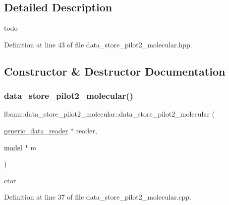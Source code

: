 \subsection{Detailed Description}
todo 

Definition at line 43 of file data\+\_\+store\+\_\+pilot2\+\_\+molecular.\+hpp.



\subsection{Constructor \& Destructor Documentation}
\mbox{\label{classlbann_1_1data__store__pilot2__molecular_a125dd5e8628bb97608bd8e4a7b7428ef}} 
\subsubsection{\texorpdfstring{data\+\_\+store\+\_\+pilot2\+\_\+molecular()}{data\_store\_pilot2\_molecular()}\hspace{0.1cm}{\footnotesize\ttfamily [1/2]}}
{\footnotesize\ttfamily lbann\+::data\+\_\+store\+\_\+pilot2\+\_\+molecular\+::data\+\_\+store\+\_\+pilot2\+\_\+molecular (\begin{DoxyParamCaption}\item[{\hyperlink{classlbann_1_1generic__data__reader}{generic\+\_\+data\+\_\+reader} $\ast$}]{reader,  }\item[{\hyperlink{classlbann_1_1model}{model} $\ast$}]{m }\end{DoxyParamCaption})}



ctor 



Definition at line 37 of file data\+\_\+store\+\_\+pilot2\+\_\+molecular.\+cpp.



